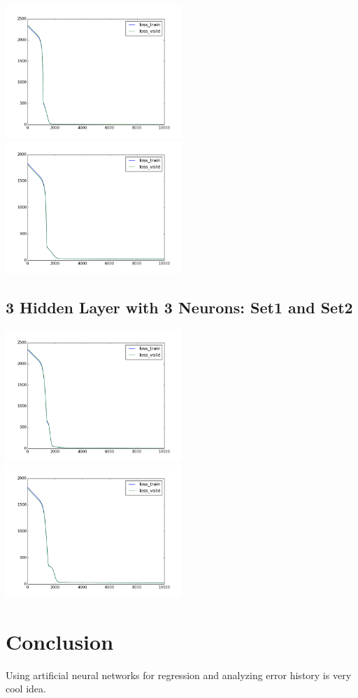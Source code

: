 \documentclass[conference]{IEEEtran}
\begin{document}
\includegraphics[width=0.5\textwidth]{set1-[3,3].png}
\includegraphics[width=0.5\textwidth]{set2-[3,3].png}

\subsection{3 Hidden Layer with 3 Neurons: Set1 and Set2}

\includegraphics[width=0.5\textwidth]{set1-[3,3,3].png}
\includegraphics[width=0.5\textwidth]{set2-[3,3,3].png}



\section{Conclusion}
Using artificial neural networks for regression and analyzing error history is very cool idea.
\end{document}
